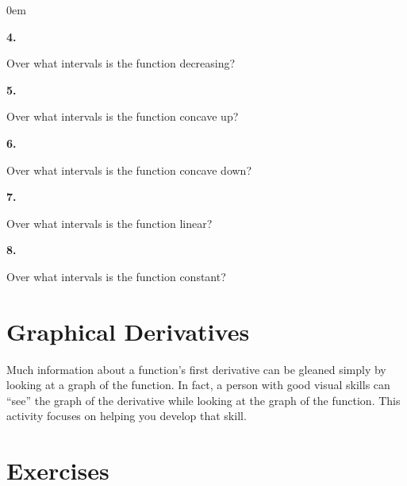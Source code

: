 \documentclass[12pt,]{book}
\theoremstyle{plain}
\theoremstyle{definition}
\numberwithin{equation}{section}
\newenvironment{exercisegroup}%
{\medskip\noindent}%
{\par\bigskip}%
\newlength{\exercisegroupindent}%
\newlength{\exercisegroupitemwidth}%
\newenvironment{exercisegrouplist}%
{\vspace{-\partopsep}%
\begin{adjustwidth}{\exercisegroupindent}{0em}}%
{\end{adjustwidth}%
\vspace{-\partopsep}%
\vspace{\baselineskip}}%
\newenvironment{exercisegroupbycol}[1]%
{\begin{exercisegrouplist}%
\vspace{-\multicolsep}%
\begin{multicols}{#1}%
\setlength{\parindent}{0em}%
\setlength{\exercisegroupitemwidth}{\linewidth}}%
{\end{multicols}%
\vspace{-\multicolsep}%
\end{exercisegrouplist}}%
\newenvironment{exercisegroupitem}[1]%
{\begin{minipage}[t]{\exercisegroupitemwidth}
\vspace{0pt}%
{\bfseries#1}%
\rule{0pt}{\baselineskip}}{\strut%
\end{minipage}%
\hspace{\columnsep}}%
\providecommand\phantomsection{}
\begin{document}
\begin{exercisegroup}
\begin{exercisegroupbycol}{1}
\par%
\begin{exercisegroupitem}{4. }\phantomsection\hypertarget{exercise-148}{\null}
Over what intervals is the function decreasing?%
\end{exercisegroupitem}%
\par%
\begin{exercisegroupitem}{5. }\phantomsection\hypertarget{exercise-149}{\null}
Over what intervals is the function concave up?%
\end{exercisegroupitem}%
\par%
\begin{exercisegroupitem}{6. }\phantomsection\hypertarget{exercise-150}{\null}
Over what intervals is the function concave down?%
\end{exercisegroupitem}%
\par%
\begin{exercisegroupitem}{7. }\phantomsection\hypertarget{exercise-151}{\null}
Over what intervals is the function linear?%
\end{exercisegroupitem}%
\par%
\begin{exercisegroupitem}{8. }\phantomsection\hypertarget{exercise-152}{\null}
Over what intervals is the function constant?%
\end{exercisegroupitem}%
\par%
\end{exercisegroupbycol}%
\end{exercisegroup}%
\typeout{************************************************}
\typeout{************************************************}
\section[Graphical Derivatives]{Graphical Derivatives}\label{section-graphical-derivatives}
Much information about a function's first derivative can be gleaned simply by looking at a graph of the function. In fact, a person with good visual skills can ``see'' the graph of the derivative while looking at the graph of the function. This activity focuses on helping you develop that skill.%
\typeout{************************************************}
\typeout{************************************************}
\section*{Exercises}\label{exercises-22}
\end{document}
